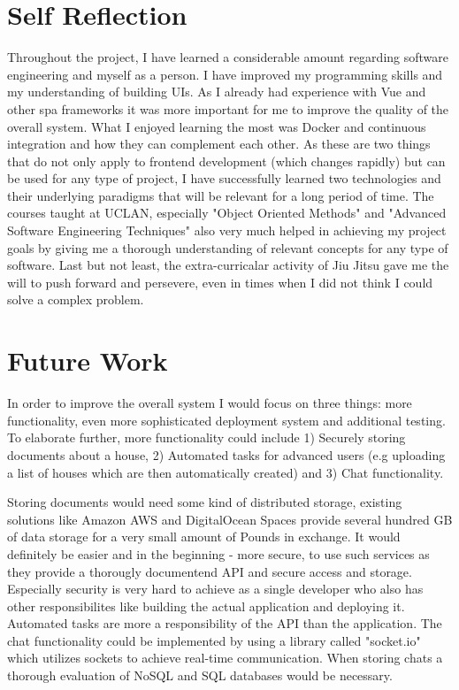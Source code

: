 \section{Self Reflection}
Throughout the project, I have learned a considerable amount regarding software engineering and myself as a person. I have improved my programming skills and my understanding of building UIs. As I already had experience with Vue and other \acrshort{spa} frameworks it was more important for me to improve the quality of the overall system. What I enjoyed learning the most was Docker and continuous integration and how they can complement each other. As these are two things that do not only apply to frontend development (which changes rapidly) but can be used for any type of project, I have successfully learned two technologies and their underlying paradigms that will be relevant for a long period of time. The courses taught at UCLAN, especially "Object Oriented Methods" and "Advanced Software Engineering Techniques" also very much helped in achieving my project goals by giving me a thorough understanding of relevant concepts for any type of software. Last but not least, the extra-curricalar activity of Jiu Jitsu gave me the will to push forward and persevere, even in times when I did not think I could solve a complex problem. 

\section{Future Work}
In order to improve the overall system I would focus on three things: more functionality, even more sophisticated deployment system and additional testing. To elaborate further, more functionality could include 1) Securely storing documents about a house, 2) Automated tasks for advanced users (e.g uploading a list of houses which are then automatically created) and 3) Chat functionality.

Storing documents would need some kind of distributed storage, existing solutions like Amazon AWS and DigitalOcean Spaces provide several hundred GB of data storage for a very small amount of Pounds in exchange. It would definitely be easier and in the beginning - more secure, to use such services as they provide a thorougly documentend API and secure access and storage. Especially security is very hard to achieve as a single developer who also has other responsibilites like building the actual application and deploying it. Automated tasks are more a responsibility of the API than the application. The chat functionality could be implemented by using a library called "socket.io" which utilizes sockets to achieve real-time communication. When storing chats a thorough evaluation of NoSQL and SQL databases would be necessary.

